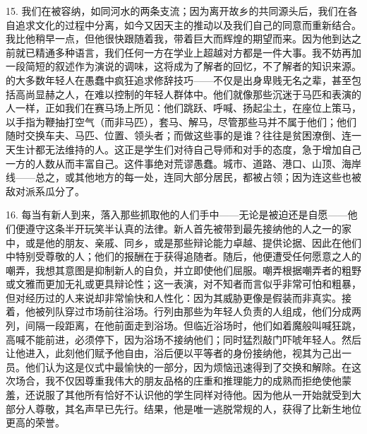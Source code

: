 15. 我们在被容纳，如同河水的两条支流；因为离开故乡的共同源头后，我们在各自追求文化的过程中分离，如今又因天主的推动以及我们自己的同意而重新结合。我比他稍早一点，但他很快跟随着我，带着巨大而辉煌的期望而来。因为他到达之前就已精通多种语言，我们任何一方在学业上超越对方都是一件大事。我不妨再加一段简短的叙述作为演说的调味，这将成为了解者的回忆，不了解者的知识来源。的大多数年轻人在愚蠢中疯狂追求修辞技巧——不仅是出身卑贱无名之辈，甚至包括高尚显赫之人，在难以控制的年轻人群体中。他们就像那些沉迷于马匹和表演的人一样，正如我们在赛马场上所见：他们跳跃、呼喊、扬起尘土，在座位上策马，以手指为鞭抽打空气（而非马匹），套马、解马，尽管那些马并不属于他们；他们随时交换车夫、马匹、位置、领头者；而做这些事的是谁？往往是贫困潦倒、连一天生计都无法维持的人。这正是学生们对待自己导师和对手的态度，急于增加自己一方的人数从而丰富自己。这件事绝对荒谬愚蠢。城市、道路、港口、山顶、海岸线——总之，或其他地方的每一处，连同大部分居民，都被占领；因为连这些也被敌对派系瓜分了。\par

16. 每当有新人到来，落入那些抓取他的人们手中——无论是被迫还是自愿——他们便遵守这条半开玩笑半认真的法律。新人首先被带到最先接纳他的人之一的家中，或是他的朋友、亲戚、同乡，或是那些辩论能力卓越、提供论据、因此在他们中特别受尊敬的人；他们的报酬在于获得追随者。随后，他便遭受任何愿意之人的嘲弄，我想其意图是抑制新人的自负，并立即使他们屈服。嘲弄根据嘲弄者的粗野或文雅而更加无礼或更具辩论性；这一表演，对不知者而言似乎非常可怕和粗暴，但对经历过的人来说却非常愉快和人性化：因为其威胁更像是假装而非真实。接着，他被列队穿过市场前往浴场。行列由那些为年轻人负责的人组成，他们分成两列，间隔一段距离，在他前面走到浴场。但临近浴场时，他们如着魔般叫喊狂跳，高喊不能前进，必须停下，因为浴场不接纳他们；同时猛烈敲门吓唬年轻人。然后让他进入，此刻他们赋予他自由，浴后便以平等者的身份接纳他，视其为己出一员。他们认为这是仪式中最愉快的一部分，因为烦恼迅速得到了交换和解除。在这次场合，我不仅因尊重我伟大的朋友品格的庄重和推理能力的成熟而拒绝使他蒙羞，还说服了其他所有恰好不认识他的学生同样对待他。因为他从一开始就受到大部分人尊敬，其名声早已先行。结果，他是唯一逃脱常规的人，获得了比新生地位更高的荣誉。\par

